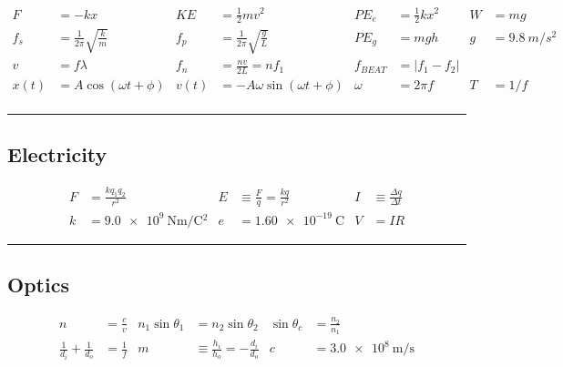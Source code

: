 \documentclass[10pt]{exam}
\begin{document}
\begin{align*}
  F  &= -kx &
  KE &= \frac{1}{2}mv^2 &
  PE_e &= \frac{1}{2}kx^2&
  W    &= mg  \\
  f_s &=\frac{1}{2\pi}\sqrt{\frac{k}{m}} &
  f_p &=\frac{1}{2\pi}\sqrt{\frac{g}{L}} &
  PE_g &= mgh  &
  g    &= \SI{9.8}{m/s^2} \\ 
  v &= f \lambda &
  f_n &= \frac{nv}{2L} = nf_1 &
  f_{BEAT} &= \left|f_1-f_2\right| \\
  x(t) &= A \cos\left(\omega t + \phi\right) &
  v(t) &= -A\omega\sin\left(\omega t + \phi\right) &
  \omega &= 2\pi f  &
  T      &= 1/f &\\
\end{align*}

\hrule

\subsection*{Electricity}

\begin{align*}
  F &= \frac{kq_1 q_2} {r^2} &
  E &\equiv \frac{F}{q} = \frac{kq}{r^2} &
  I &\equiv \frac{\Delta q}{\Delta t} \\
  k &= \SI{9.0e9}{\newton\meter\per\coulomb^2} &
  e &= \SI{1.60e-19}{\coulomb} &
  V &= IR
\end{align*}

\hrule




\subsection*{Optics}

\begin{align*}
  n &= \frac{c}{v} &
  n_1 \sin\theta_1 &= n_2\sin\theta_2 &
  \sin\theta_c &= \frac{n_2}{n_1} \\
  \frac{1}{d_i} + \frac{1}{d_o} &= \frac{1}{f} &
  m &\equiv \frac{h_i}{h_o} = -\frac{d_i}{d_o} &
  c &= \SI {3.0e8}{\meter\per\second}
\end{align*}
\end{document}
